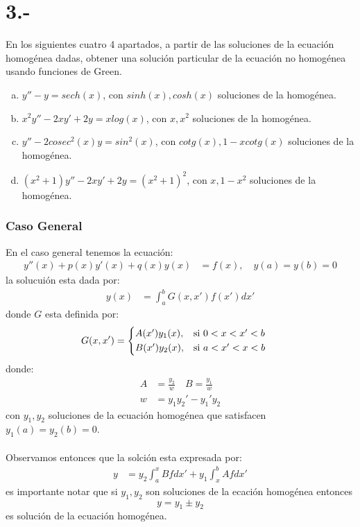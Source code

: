 \documentclass{article}
\begin{document}
\section*{3.-} 
En los siguientes cuatro 4 apartados, a partir de las soluciones
de la ecuación homogénea dadas, obtener una solución particular 
de la ecuación no homogénea usando funciones de Green.
\begin{enumerate}[a)]
    \item $y''-y=sech(x)$, con $sinh(x), cosh(x)$ soluciones de la homogénea.
    \item $x^2y''-2xy'+2y=xlog(x)$, con $x, x^2$ soluciones de la homogénea.
    \item $y''-2cosec^2(x)y=sin^2(x)$, con $cotg(x), 1-xcotg(x)$ soluciones de la homogénea.
    \item $(x^2+1)y''-2xy'+2y=(x^2+1)^2$, con $x, 1-x^2$ soluciones de la homogénea.
\end{enumerate}
\begin{tcolorbox}
    \subsubsection*{Caso General}
    En el caso general tenemos la ecuación:
    \begin{align*}
        y''(x) + p(x)y'(x) + q(x)y(x) &= f(x), \quad y(a) = y(b) = 0
    \end{align*}
    la solucuión esta dada por:
    \begin{align*}
        y(x) &= \int_{a}^b G(x,x')f(x')dx'
    \end{align*}
    donde $G$ esta definida por:
    \begin{align*}
        G(x,x') &=
        \begin{cases*}
            A(x')y_1(x), & si $0<x<x'<b$ \\
            B(x')y_2(x),& si $a<x'<x<b$
        \end{cases*}  
    \end{align*}
    donde:
    \begin{align*}
        A &= \frac{y_2}{w} 
        \quad B = \frac{y_1}{w} \\ 
        w &= y_1y_2'-y_1'y_2
    \end{align*}
    con $y_1,y_2$ soluciones de la ecuación homogénea 
    que satisfacen $y_1(a) = y_2(b) = 0$. \\ \\
    Observamos entonces que la solción esta expresada por:
    \begin{align*}
        y &= y_2\int_{a}^x Bf dx' + y_1\int_{x}^b Afdx' 
    \end{align*}
    es importante notar que si $y_1, y_2$ son soluciones de la ecación homogénea
    entonces 
    \[ y = y_1 \pm y_2 \] 
    es solución de la ecuación homogénea.
    
    
\end{tcolorbox}
\end{document}
